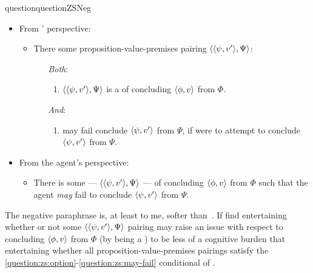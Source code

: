 \begin{note}[\qzS{} \(\forall\)]
{\begin{restatable}[\nqzS{}]{question}{questionZSNeg}
      \begin{itemize}
      \item
        From \vAgent{}' perspective:
        \begin{itemize}
        \item
          There some proposition-value-premises pairing \(\langle \langle \psi, v' \rangle, \Psi \rangle\):
          \begin{itemize}
          \item[\emph{Both}:]
            \begin{enumerate}[label=\alph*., ref=(\alph*)]
            \item
              \(\langle \langle \psi, v' \rangle, \Psi \rangle\) is a \requ{} of concluding \(\langle \phi, v \rangle\) from \(\Phi\).
            \end{enumerate}
          \item[\emph{And}:]
            \begin{enumerate}[label=\alph*., ref=(\alph*), resume]
            \item
              \label{question:zs:may-fail}
              \vAgent{} may fail conclude \(\langle \psi, v' \rangle\) from \(\Psi\), if \vAgent{} were to attempt to conclude \(\langle \psi, v' \rangle\) from \(\Psi\).
            \end{enumerate}
          \end{itemize}
        \end{itemize}
      \end{itemize}
      \vspace{-\baselineskip}
    \end{restatable}
  }
  \begin{itemize}
  \item
    From the agent's perspective:
    \begin{itemize}
    \item
      There is some \requ{} --- \(\langle \langle \psi, v' \rangle, \Psi \rangle\) --- of concluding \(\langle \phi, v \rangle\) from \(\Phi\) such that the agent \emph{may} fail to conclude \(\langle \psi, v' \rangle\) from \(\Psi\).
    \end{itemize}
  \end{itemize}

  The negative paraphrase is, at least to me, softer than~\qzS{}.
  If find entertaining whether or not some \(\langle \langle \psi, v' \rangle, \Psi \rangle\) pairing may raise an issue with respect to concluding \(\langle \phi, v \rangle\) from \(\Phi\) (by being a \requ{}) to be less of a cognitive burden that entertaining whether all proposition-value-premises pairings satisfy the \ref{question:zs:option}-\ref{question:zs:may-fail} conditional of \qzS{}.


\end{note}

